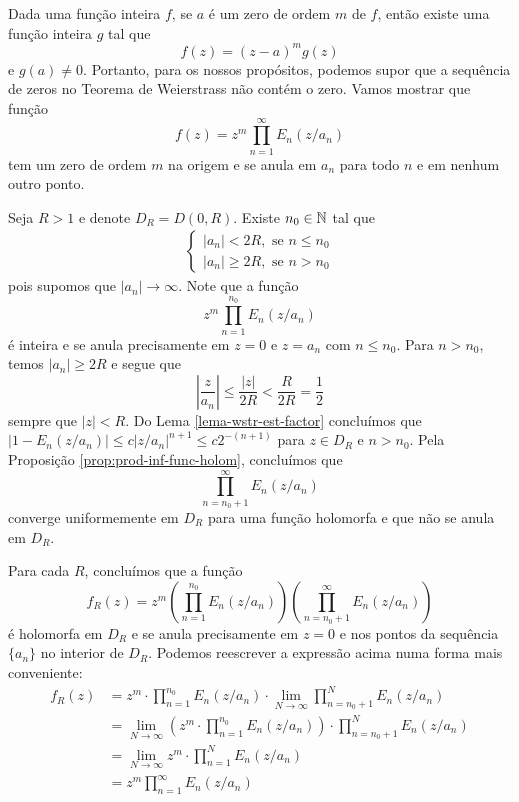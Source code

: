    Dada uma função inteira $f$, se $a$ é um zero de ordem $m$ de $f$, então existe uma função inteira $g$ tal que
    $$ f(z) = (z-a)^mg(z) $$
    e $g(a) \neq 0$. Portanto, para os nossos propósitos, podemos supor que a sequência de zeros no Teorema de Weierstrass não contém o zero. Vamos mostrar que função 
    $$ f(z) = z^m \prod_{n=1}^{\infty}E_n(z/a_n) $$
    tem um zero de ordem $m$ na  origem e se anula em $a_n$ para todo $n$ e em nenhum outro ponto.
    
    Seja $R>1$ e denote $D_R = D(0,R)$. Existe $n_0 \in \mathbb{N}$ tal que 
    \begin{align*}
        \begin{cases}
            |a_n| < 2R, \text{ se } n \leq n_0 \\
            |a_n| \geq 2R, \text{ se } n > n_0
        \end{cases}
    \end{align*}
    pois supomos que $|a_n| \to \infty$. Note que a função 
    $$z^m\prod_{n=1}^{n_0}E_n(z/a_n)$$
    é inteira e se anula precisamente em $z = 0$ e $z = a_n$ com $n \leq n_0$. Para $n > n_0$, temos $|a_n| \geq 2R$ e segue que
    $$ \left | \frac{z}{a_n} \right | \leq \frac{|z|}{2R} < \frac{R}{2R} = \frac{1}{2} $$
    sempre que $|z| < R$. Do Lema \ref{lema-wstr-est-factor} concluímos que $|1 - E_n(z/a_n)| \leq c|z/a_n|^{n+1} \leq c2^{-(n+1)}$ para $z \in D_R$ e $n > n_0$. Pela Proposição \ref{prop:prod-inf-func-holom}, concluímos que 
    $$\prod_{n=n_0 + 1}^{\infty}E_n(z/a_n)$$
    converge uniformemente em $D_R$ para uma função holomorfa e que não se anula em $D_R$.
    
    Para cada $R$, concluímos que a função 
    $$f_R (z) = z^m\left(\prod_{n=1}^{n_0}E_n(z/a_n)\right)\left(\prod_{n=n_0 + 1}^{\infty}E_n(z/a_n)\right)$$
    é holomorfa em $D_R$ e se anula precisamente em $z = 0$ e nos pontos da sequência $\{a_n\}$ no interior de $D_R$. Podemos reescrever a expressão acima numa forma mais conveniente:
    \begin{align*}
        f_R (z) &= z^m \cdot \prod_{n=1}^{n_0}E_n(z/a_n) \cdot \lim_{N \to \infty}\prod_{n=n_0 + 1}^{N}E_n(z/a_n) \\
        &= \lim_{N \to \infty} \left( z^m \cdot \prod_{n=1}^{n_0}E_n(z/a_n) \right) \cdot \prod_{n=n_0 + 1}^{N}E_n(z/a_n) \\
        &= \lim_{N \to \infty}  z^m \cdot \prod_{n=1}^{N}E_n(z/a_n) \\
        &= z^m \prod_{n=1}^{\infty}E_n(z/a_n) 
    \end{align*}
    
